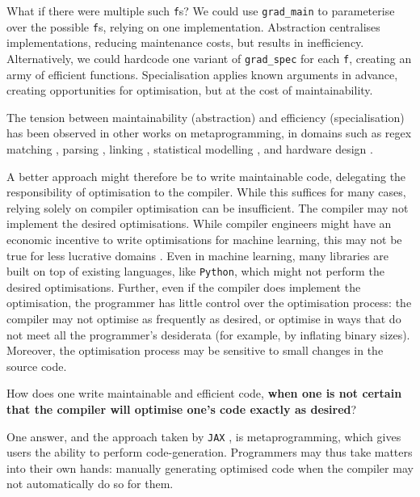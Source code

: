 What if there were multiple such \texttt{f}s? We could use \texttt{grad_main} to parameterise over the possible \texttt{f}s, relying on one implementation. Abstraction centralises implementations, reducing maintenance costs, but results in inefficiency. Alternatively, we could hardcode one variant of \texttt{grad_spec} for each \texttt{f}, creating an army of efficient functions. Specialisation applies known arguments in advance, creating opportunities for optimisation, but at the cost of maintainability. 

The tension between maintainability (abstraction) and efficiency (specialisation) has been observed in other works on metaprogramming, in domains such as regex matching \citep{tratt-2008}, parsing \citep{yallop-2023}, linking \citep{servetto-2013}, statistical modelling \citep{wickham-2019}, and hardware design \citep{vandebon-2021}.

A better approach might therefore be to write maintainable code, delegating the responsibility of optimisation to the compiler. While this suffices for many cases, relying solely on compiler optimisation can be insufficient. The compiler may not implement the desired optimisations. While compiler engineers might have an economic incentive to write optimisations for machine learning, this may not be true for less lucrative domains \citep{robinson-01}. Even in machine learning, many libraries are built on top of existing languages, like \texttt{Python}, which might not perform the desired optimisations. Further, even if the compiler does implement the optimisation, the programmer has little control over the optimisation process: the compiler may not optimise as frequently as desired, or optimise in ways that do not meet all the programmer's desiderata (for example, by inflating binary sizes). Moreover, the optimisation process may be sensitive to small changes in the source code.

How does one write maintainable and efficient code, \textbf{when one is not certain that the compiler will optimise one's code exactly as desired}?

One answer, and the approach taken by \texttt{JAX} \citep{jax-grad-metaprogramming}, is metaprogramming, which gives users the ability to perform code-generation. Programmers may thus take matters into their own hands: manually generating optimised code when the compiler may not automatically do so for them. 

